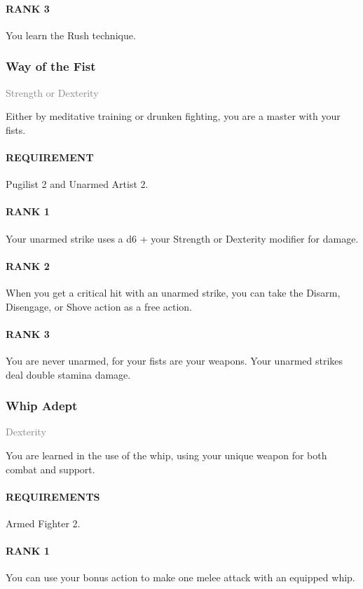 \paragraph{RANK 3} You learn the Rush technique.

\subsubsection{Way of the Fist} \label{feat::wayofthefist}
\small{\textcolor{gray}{Strength or Dexterity}}

\normalsize
Either by meditative training or drunken fighting, you are a master with your fists.
\paragraph{REQUIREMENT} Pugilist 2 and Unarmed Artist 2.
\paragraph{RANK 1} Your unarmed strike uses a d6 + your Strength or Dexterity modifier for damage.
\paragraph{RANK 2} When you get a critical hit with an unarmed strike, you can take the Disarm, Disengage, or Shove action as a free action.
\paragraph{RANK 3} You are never unarmed, for your fists are your weapons.
Your unarmed strikes deal double stamina damage.

\subsubsection{Whip Adept} \label{feat::whipadept}
\small{\textcolor{gray}{Dexterity}}

\normalsize
You are learned in the use of the whip, using your unique weapon for both combat and support.
\paragraph{REQUIREMENTS} Armed Fighter 2.
\paragraph{RANK 1} You can use your bonus action to make one melee attack with an equipped whip.
